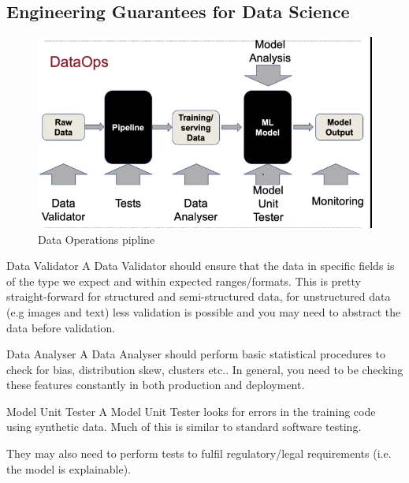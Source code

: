 \documentclass[11pt,a4paper]{article}
\begin{document}
\subsection{Engineering Guarantees for Data Science}

  \begin{figure}[H]
    \centering\includegraphics[width=.7\textwidth]{DataOps.PNG}
    \caption{Data Operations pipline}
    \label{fig_data_ops}
  \end{figure}

  \begin{proposition}{Data Validator}
    A Data Validator should ensure that the data in specific fields is of the type we expect and within expected ranges/formats. This is pretty straight-forward for structured and semi-structured data, for unstructured data (e.g images and text) less validation is possible and you may need to abstract the data before validation.
  \end{proposition}

  \begin{proposition}{Data Analyser}
    A Data Analyser should perform basic statistical procedures to check for bias, distribution skew, clusters etc.. In general, you need to be checking these features constantly in both production and deployment.
  \end{proposition}

  \begin{proposition}{Model Unit Tester}
    A Model Unit Tester looks for errors in the training code using synthetic data. Much of this is similar to standard software testing.
    \par They may also need to perform tests to fulfil regulatory/legal requirements (i.e. the model is explainable).
  \end{proposition}
\end{document}
